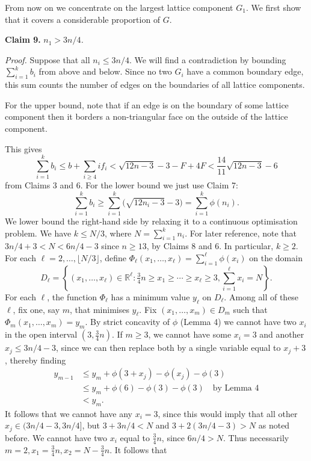 \documentclass{article}
\begin{document}
From now on we concentrate on the largest lattice component $G_{1}$. We first show that it covers a considerable proportion of $G$.

\textbf{Claim 9.} $n_{1} > 3n/4$\textit{.}

\textit{Proof.} Suppose that all $n_{i} \le 3n/4$. We will find a contradiction by bounding $\sum^{k}_{i = 1} b_{i}$ from above and below. Since no two $G_{i}$ have a common boundary edge, this sum counts the number of edges on the boundaries of all lattice components.

For the upper bound, note that if an edge is on the boundary of some lattice component then it borders a non-triangular face on the outside of the lattice component.

This gives 
\begin{equation*}
\sum_{i=1}^{k} b_i \le b + \sum_{i\ge 4} i f_i < \sqrt{12n-3} - 3 - F + 4F < \frac{14}{11}\sqrt{12n-3} - 6 \tag{6}
\end{equation*} from Claims 3 and 6. For the lower bound we just use Claim 7: 
\begin{equation*}
\sum_{i=1}^{k} b_i \ge \sum_{i=1}^{k}\bigl(\sqrt{12n_i-3} - 3\bigr) = \sum_{i=1}^{k}\phi(n_i). \tag{7}
\end{equation*} We lower bound the right-hand side by relaxing it to a continuous optimisation problem. We have $k \le N/3$, where $N = \sum^{k}_{i = 1} n_{i}$. For later reference, note that $3n/4 + 3 < N < 6n/4 - 3$ since $n \ge 13$, by Claims 8 and 6. In particular, $k \ge 2$. For each $\ell = 2, \ldots, \lfloor N/3\rfloor$, define $\Phi_{\ell}(x_{1}, \ldots, x_{\ell}) = \sum^{\ell}_{i = 1} \phi(x_{i})$ on the domain 
\begin{equation*}
D_\ell = \left\{(x_1,\ldots,x_\ell) \in \mathbb{R}^\ell : \tfrac{3}{4}n \ge x_1 \ge \cdots \ge x_\ell \ge 3, \sum_{i=1}^{\ell} x_i = N\right\}.
\end{equation*} For each $\ell$, the function $\Phi_{\ell}$ has a minimum value $y_{\ell}$ on $D_{\ell}$. Among all of these $\ell$, fix one, say $m$, that minimises $y_{\ell}$. Fix $(x_{1}, \ldots, x_{m}) \in D_{m}$ such that $\Phi_{m}(x_{1}, \ldots, x_{m}) = y_{m}$. By strict concavity of $\phi$ (Lemma 4) we cannot have two $x_{i}$ in the open interval $(3, \frac{3}{4}n)$. If $m \ge 3$, we cannot have some $x_{i} = 3$ and another $x_{j} \le 3n/4 - 3$, since we can then replace both by a single variable equal to $x_{j} + 3$, thereby finding 
\begin{align*}
y_{m-1} &\le y_m + \phi(3 + x_j) - \phi(x_j) - \phi(3)\\
&\le y_m + \phi(6) - \phi(3) - \phi(3) \quad\text{by Lemma 4}\\
&< y_m.
\end{align*} It follows that we cannot have any $x_{i} = 3$, since this would imply that all other $x_{j} \in (3n/4 - 3, 3n/4]$, but $3 + 3n/4 < N$ and $3 + 2(3n/4 - 3) > N$ as noted before. We cannot have two $x_{i}$ equal to $\frac{3}{4}n$, since $6n/4 > N$. Thus necessarily $m = 2, x_{1} = \frac{3}{4}n, x_{2} = N - \frac{3}{4}n$. It follows that 
\end{document}
